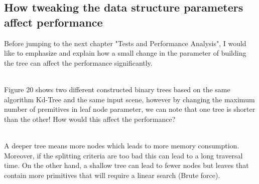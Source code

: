 \documentclass[11pt,a4paper]{article}
\begin{document}
\subsection{How tweaking the data structure parameters affect performance}
Before jumping to the next chapter "Tests and Performance Analysis", I would like to emphasize and explain how a small change in the parameter of building the tree can affect the performance significantly. 

\noindent
\\
Figure 20 shows two different constructed binary trees based on the same algorithm Kd-Tree and the same input scene, however by changing the maximum number of premitives in leaf node parameter, we can note that one tree is shorter than the other! How would this affect the performance? 

\noindent
\\
A deeper tree means more nodes which leads to more memory consumption. Moreover, if the splitting criteria are too bad this can lead to a long traversal time. On the other hand, a shallow tree can lead to fewer nodes but leaves that contain more primitives that will require a linear search (Brute force).    
\end{document}
